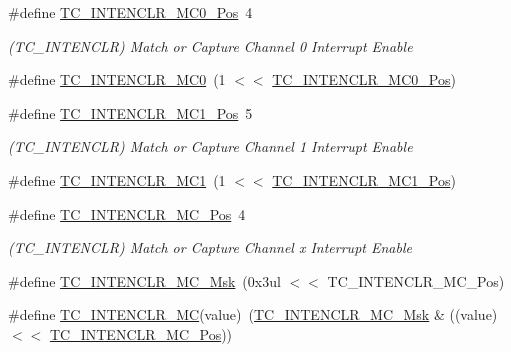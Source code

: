 \begin{DoxyCompactItemize}
\#define \mbox{\hyperlink{group___s_a_m_d21___t_c_ga04317541f61352516d78133796dd3dfc}{T\+C\+\_\+\+I\+N\+T\+E\+N\+C\+L\+R\+\_\+\+M\+C0\+\_\+\+Pos}}~4
\begin{DoxyCompactList}\small\item\em (T\+C\+\_\+\+I\+N\+T\+E\+N\+C\+LR) Match or Capture Channel 0 Interrupt Enable \end{DoxyCompactList}\item 
\#define \mbox{\hyperlink{group___s_a_m_d21___t_c_ga785b9ecc4202b0558d377541a81b36f7}{T\+C\+\_\+\+I\+N\+T\+E\+N\+C\+L\+R\+\_\+\+M\+C0}}~(1 $<$$<$ \mbox{\hyperlink{group___s_a_m_d21___t_c_ga04317541f61352516d78133796dd3dfc}{T\+C\+\_\+\+I\+N\+T\+E\+N\+C\+L\+R\+\_\+\+M\+C0\+\_\+\+Pos}})
\item 
\#define \mbox{\hyperlink{group___s_a_m_d21___t_c_gab7fc14644fd9f8611b8d0ea22ee30f4c}{T\+C\+\_\+\+I\+N\+T\+E\+N\+C\+L\+R\+\_\+\+M\+C1\+\_\+\+Pos}}~5
\begin{DoxyCompactList}\small\item\em (T\+C\+\_\+\+I\+N\+T\+E\+N\+C\+LR) Match or Capture Channel 1 Interrupt Enable \end{DoxyCompactList}\item 
\#define \mbox{\hyperlink{group___s_a_m_d21___t_c_gac037ee7549ccaaeaa2d8002b328b27ec}{T\+C\+\_\+\+I\+N\+T\+E\+N\+C\+L\+R\+\_\+\+M\+C1}}~(1 $<$$<$ \mbox{\hyperlink{group___s_a_m_d21___t_c_gab7fc14644fd9f8611b8d0ea22ee30f4c}{T\+C\+\_\+\+I\+N\+T\+E\+N\+C\+L\+R\+\_\+\+M\+C1\+\_\+\+Pos}})
\item 
\#define \mbox{\hyperlink{group___s_a_m_d21___t_c_ga3826df25c9857e2d7c15e1eb646fab6d}{T\+C\+\_\+\+I\+N\+T\+E\+N\+C\+L\+R\+\_\+\+M\+C\+\_\+\+Pos}}~4
\begin{DoxyCompactList}\small\item\em (T\+C\+\_\+\+I\+N\+T\+E\+N\+C\+LR) Match or Capture Channel x Interrupt Enable \end{DoxyCompactList}\item 
\#define \mbox{\hyperlink{group___s_a_m_d21___t_c_ga602ab940f6ef6e0b1a9c48face0d32c5}{T\+C\+\_\+\+I\+N\+T\+E\+N\+C\+L\+R\+\_\+\+M\+C\+\_\+\+Msk}}~(0x3ul $<$$<$ T\+C\+\_\+\+I\+N\+T\+E\+N\+C\+L\+R\+\_\+\+M\+C\+\_\+\+Pos)
\item 
\#define \mbox{\hyperlink{group___s_a_m_d21___t_c_ga775d5e985e44041de70102de750a53ff}{T\+C\+\_\+\+I\+N\+T\+E\+N\+C\+L\+R\+\_\+\+MC}}(value)~(\mbox{\hyperlink{group___s_a_m_d21___t_c_ga602ab940f6ef6e0b1a9c48face0d32c5}{T\+C\+\_\+\+I\+N\+T\+E\+N\+C\+L\+R\+\_\+\+M\+C\+\_\+\+Msk}} \& ((value) $<$$<$ \mbox{\hyperlink{group___s_a_m_d21___t_c_ga3826df25c9857e2d7c15e1eb646fab6d}{T\+C\+\_\+\+I\+N\+T\+E\+N\+C\+L\+R\+\_\+\+M\+C\+\_\+\+Pos}}))

\end{DoxyCompactItemize}
